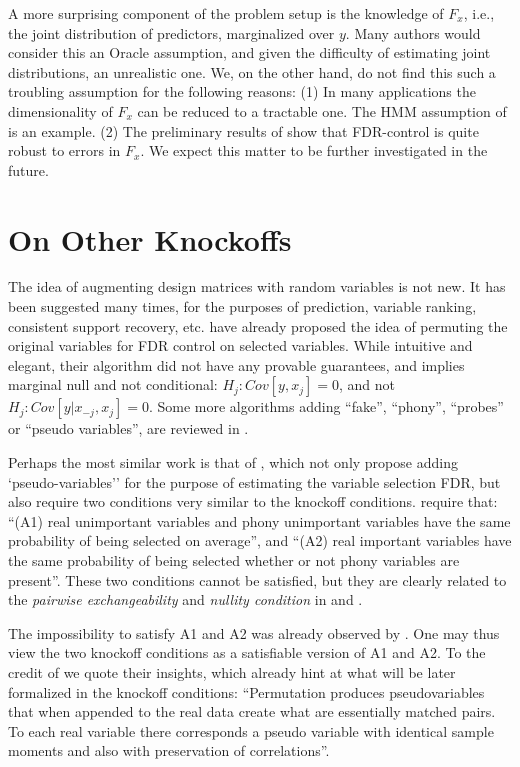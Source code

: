 \documentclass[article,lineno]{biometrika}
\begin{document}
A more surprising component of the problem setup is the knowledge of $F_x$, i.e., the joint distribution of predictors, marginalized over $y$. 
Many authors would consider this an Oracle assumption, and given the difficulty of estimating joint distributions, an unrealistic one. 
We, on the other hand, do not find this such a troubling assumption for the following reasons:
(1) In many applications the dimensionality of $F_x$ can be reduced to a tractable one. The HMM assumption of \cite{SesiaGenehuntinghidden} is an example. 
(2) The preliminary results of \cite{CandesPanninggoldmodelX2018} show that FDR-control is quite robust to errors in $F_x$. We expect this matter to be further investigated in the future. 






\section{On Other Knockoffs}
The idea of augmenting design matrices with random variables is not new. 
It has been suggested many times, for the purposes of prediction, variable ranking, consistent support recovery, etc. 
\cite{TusherSignificanceanalysismicroarrays2001} have already proposed the idea of permuting the original variables for FDR control on selected variables.
While intuitive and elegant, their algorithm did not have any provable guarantees, and implies marginal null and not conditional: $H_j:Cov[y,x_j]=0$, and not $H_j:Cov[y|x_{-j},x_j]=0$.
Some more algorithms adding ``fake'', ``phony'', ``probes'' or ``pseudo variables'', are reviewed in \cite{GuyonIntroductionVariableFeature2003}.

Perhaps the most similar work is that of \cite{WuControllingVariableSelection2007}, which not only propose adding `pseudo-variables'' for the purpose of estimating the variable selection FDR, but also require two conditions very similar to the knockoff conditions. 
\cite{WuControllingVariableSelection2007} require that:
``(A1) real unimportant variables and phony unimportant variables have the same probability of being selected on average'', and 
``(A2) real important variables have the same probability of being selected whether or not phony variables are present''.
These two conditions cannot be satisfied, but they are clearly related to the \emph{pairwise exchangeability} and \emph{nullity condition} in \cite{SesiaGenehuntinghidden} and \cite{CandesPanninggoldmodelX2018}.

The impossibility to satisfy A1 and A2 was already observed by \cite{WuControllingVariableSelection2007}. 
One may thus view the two knockoff conditions as a satisfiable version of A1 and A2.
To the credit of \cite{WuControllingVariableSelection2007} we quote their insights, which already hint at what will be later formalized in the knockoff conditions:
``Permutation produces pseudovariables that when appended to the real data create what
are essentially matched pairs. To each real variable there corresponds a pseudo variable with identical sample moments and also with preservation of correlations''.
\end{document}

